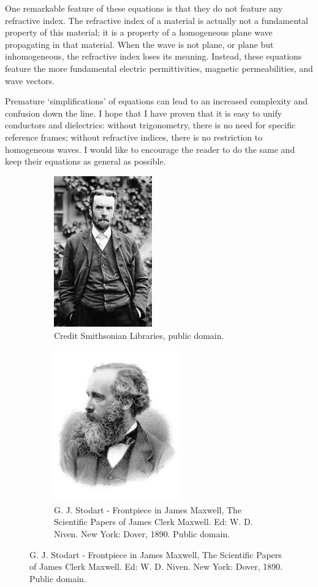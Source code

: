 One remarkable feature of these equations is that they do not feature any refractive index.
The refractive index of a material is actually not a fundamental property of this material; it is a property of a homogeneous plane wave propagating in that material.
When the wave is not plane, or plane but inhomogeneous, the refractive index loses its meaning.
Instead, these equations feature the more fundamental electric permittivities, magnetic permeabilities, and wave vectors.

Premature `simplifications' of equations can lead to an increased complexity and confusion down the line.
I hope that I have proven that it is easy to unify conductors and dielectrics:
without trigonometry, there is no need for specific reference frames;
without refractive indices, there is no restriction to homogeneous waves.
I would like to encourage the reader to do the same and keep their equations as general as possible.


\begin{figure}[b]
    \centering
    \begin{subfigure}[t]{.47\textwidth}
        \centering
        \includegraphics[height=6.5cm]{oheaviside}
        \caption*{Photograph of Oliver Heaviside, circa 1900.}
        \caption*{Credit Smithsonian Libraries, public domain.}
    \end{subfigure}
    \hfill%
    \begin{subfigure}[t]{.47\textwidth}
        \centering
        \includegraphics[height=6.5cm]{jamesclerkmaxwell}
        \caption*{Engraving of James Clerk Maxwell by G. J. Stodart from a photograph by Fergus of Greenock.}
        \caption*{G. J. Stodart - Frontpiece in James Maxwell, The Scientific Papers of James Clerk Maxwell. Ed: W. D. Niven. New York: Dover, 1890.  Public domain.}
    \end{subfigure}%
\end{figure}


